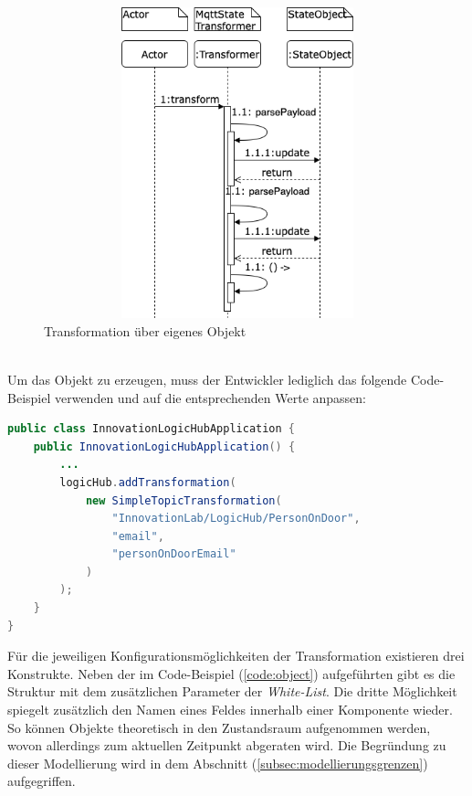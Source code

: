     \begin{figure}[hbt!]
        \centering
        \includegraphics[width=14cm,height=9cm,keepaspectratio]{images/Transformation_new.drawio.png}
        \caption{Transformation über eigenes Objekt}
        \label{fig:sequenceTransformationNew}
    \end{figure}
    \\
    Um das Objekt zu erzeugen, muss der Entwickler lediglich das folgende Code-Beispiel verwenden und auf die entsprechenden Werte anpassen:
\begin{lstlisting}[language=Java, frame=lines, xleftmargin=\parindent, style=algoBericht, label={code:object}, captionpos=b, caption={Transformation über ein eigenes Objekt}]
public class InnovationLogicHubApplication {
    public InnovationLogicHubApplication() {
        ... 
        logicHub.addTransformation(
            new SimpleTopicTransformation(
                "InnovationLab/LogicHub/PersonOnDoor",
                "email",
                "personOnDoorEmail"
            )
        );
    }
}
\end{lstlisting}
    Für die jeweiligen Konfigurationsmöglichkeiten der Transformation existieren drei Konstrukte. 
    Neben der im Code-Beispiel (\ref{code:object}) aufgeführten gibt es die Struktur mit dem zusätzlichen Parameter der \textit{White-List}. 
    Die dritte Möglichkeit spiegelt zusätzlich den Namen eines Feldes innerhalb einer Komponente wieder. So können Objekte theoretisch in den Zustandsraum 
    aufgenommen werden, wovon allerdings zum aktuellen Zeitpunkt abgeraten wird. Die Begründung zu dieser Modellierung wird in dem Abschnitt 
    (\ref{subsec:modellierungsgrenzen}) aufgegriffen. 
    \\
